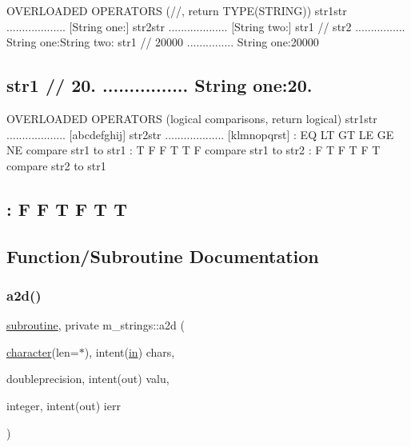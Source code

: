 O\+V\+E\+R\+L\+O\+A\+D\+ED O\+P\+E\+R\+A\+T\+O\+RS (//, return T\+Y\+P\+E(\+S\+T\+R\+I\+N\+G)) str1str ................... \mbox{[}String one\+:\mbox{]} str2str ................... \mbox{[}String two\+:\mbox{]} str1 // str2 ................ String one\+:String two\+: str1 // 20000 ............... String one\+:20000 \subsection*{str1 // 20. ................ String one\+:20. }

O\+V\+E\+R\+L\+O\+A\+D\+ED O\+P\+E\+R\+A\+T\+O\+RS (logical comparisons, return logical) str1str ................... \mbox{[}abcdefghij\mbox{]} str2str ................... \mbox{[}klmnopqrst\mbox{]} \+: EQ LT GT LE GE NE compare str1 to str1 \+: T F F T T F compare str1 to str2 \+: F T F T F T compare str2 to str1 \subsection*{\+: F F T F T T }

\subsection{Function/\+Subroutine Documentation}
\mbox{\label{namespacem__strings_a751d3101d8404ea10db4d8ba59a75d6b}} 
\subsubsection{\texorpdfstring{a2d()}{a2d()}}
{\footnotesize\ttfamily \hyperlink{M__stopwatch_83_8txt_acfbcff50169d691ff02d4a123ed70482}{subroutine}, private m\+\_\+strings\+::a2d (\begin{DoxyParamCaption}\item[{\hyperlink{option__stopwatch_83_8txt_abd4b21fbbd175834027b5224bfe97e66}{character}(len=$\ast$), intent(\hyperlink{M__journal_83_8txt_afce72651d1eed785a2132bee863b2f38}{in})}]{chars,  }\item[{doubleprecision, intent(out)}]{valu,  }\item[{integer, intent(out)}]{ierr }\end{DoxyParamCaption})\hspace{0.3cm}{\ttfamily [private]}}



